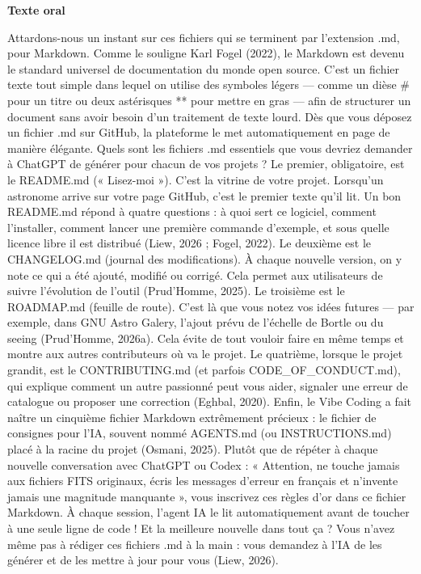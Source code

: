\documentclass[10pt,letterpaper]{article}
\newcommand{\repere}[1]{\textcolor{accent}{\bfseries #1}\par}
\begin{document}
\par\medskip\repere{Texte oral}

Attardons-nous un instant sur ces fichiers qui se terminent par l'extension .md, pour Markdown. Comme le souligne Karl Fogel (2022), le Markdown est devenu le standard universel de documentation du monde open source. C'est un fichier texte tout simple dans lequel on utilise des symboles légers — comme un dièse \# pour un titre ou deux astérisques ** pour mettre en gras — afin de structurer un document sans avoir besoin d'un traitement de texte lourd. Dès que vous déposez un fichier .md sur GitHub, la plateforme le met automatiquement en page de manière élégante. Quels sont les fichiers .md essentiels que vous devriez demander à ChatGPT de générer pour chacun de vos projets ? Le premier, obligatoire, est le README.md (« Lisez-moi »). C'est la vitrine de votre projet. Lorsqu'un astronome arrive sur votre page GitHub, c'est le premier texte qu'il lit. Un bon README.md répond à quatre questions : à quoi sert ce logiciel, comment l'installer, comment lancer une première commande d'exemple, et sous quelle licence libre il est distribué (Liew, 2026 ; Fogel, 2022). Le deuxième est le CHANGELOG.md (journal des modifications). À chaque nouvelle version, on y note ce qui a été ajouté, modifié ou corrigé. Cela permet aux utilisateurs de suivre l'évolution de l'outil (Prud'Homme, 2025). Le troisième est le ROADMAP.md (feuille de route). C'est là que vous notez vos idées futures — par exemple, dans GNU Astro Galery, l'ajout prévu de l'échelle de Bortle ou du seeing (Prud'Homme, 2026a). Cela évite de tout vouloir faire en même temps et montre aux autres contributeurs où va le projet. Le quatrième, lorsque le projet grandit, est le CONTRIBUTING.md (et parfois CODE\_OF\_CONDUCT.md), qui explique comment un autre passionné peut vous aider, signaler une erreur de catalogue ou proposer une correction (Eghbal, 2020). Enfin, le Vibe Coding a fait naître un cinquième fichier Markdown extrêmement précieux : le fichier de consignes pour l'IA, souvent nommé AGENTS.md (ou INSTRUCTIONS.md) placé à la racine du projet (Osmani, 2025). Plutôt que de répéter à chaque nouvelle conversation avec ChatGPT ou Codex : « Attention, ne touche jamais aux fichiers FITS originaux, écris les messages d'erreur en français et n'invente jamais une magnitude manquante », vous inscrivez ces règles d'or dans ce fichier Markdown. À chaque session, l'agent IA le lit automatiquement avant de toucher à une seule ligne de code ! Et la meilleure nouvelle dans tout ça ? Vous n'avez même pas à rédiger ces fichiers .md à la main : vous demandez à l'IA de les générer et de les mettre à jour pour vous (Liew, 2026).\par
\end{document}
